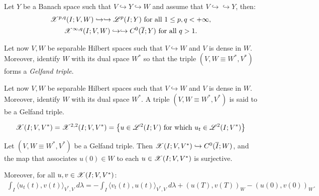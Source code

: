 \begin{theorem}
    Let $Y$ be a Banach space such that $V \hookrightarrow Y \hookrightarrow W$ and assume that $V \hookrightarrow \hookrightarrow Y$, then:
    \begin{gather}
        \mathscr{X}^{p, q}(I; V, W) \hookrightarrow \hookrightarrow \mathscr{L}^{p}(I; Y) \text{ for all } 1 \leq p, q < +\infty,\\
        \mathscr{X}^{\infty, q}(I; V, W) \hookrightarrow \hookrightarrow C^0(\overline{I}; Y) \text{ for all } q > 1.
    \end{gather}
\end{theorem}

Let now $V, W$ be separable Hilbert spaces such that $V \hookrightarrow W$ and $V$ is dense in $W$. Moreover, identify $W$ with its dual space $W^*$ so that the triple $(V, W \equiv W^*, V^*)$ forms a \textit{Gelfand triple}.

\begin{definition} \label{definition:gelfand}
    Let now $V, W$ be separable Hilbert spaces such that $V \hookrightarrow W$ and $V$ is dense in $W$. Moreover, identify $W$ with its dual space $W^*$. A triple $\left( V, W \equiv W^*, V^* \right)$ is said to be a Gelfand triple.
\end{definition}

\begin{definition}[$\X(I; V, V^*)$] \label{definition:x}
    \begin{gather}
        \mathscr{X}(I; V, V^*) = \mathscr{X}^{2, 2}(I; V, V^*) = \left\{ u \in \mathscr{L}^{2}(I; V) \text{ for which } u_t \in \mathscr{L}^{2}(I; V^*) \right\}
    \end{gather}
\end{definition}

\begin{theorem}
    Let $\left( V, W \equiv W^*, V^* \right)$ be a Gelfand triple. Then $\mathscr{X}(I; V, V^*) \hookrightarrow C^0(\overline{I};W)$, and the map that associates $u(0) \in W$ to each $u \in \mathscr{X}(I; V, V^*)$ is surjective.

    Moreover, for all $u, v \in \mathscr{X}(I; V, V^*)$:
    \begin{gather}
        \int_I \langle u_t(t), v(t) \rangle_{V^*, V} ~ d \lambda = - \int_I \langle v_t(t), u(t) \rangle_{V^*, V} ~ d \lambda + \left( u(T), v(T) \right)_W - \left( u(0), v(0) \right)_W.
    \end{gather}
\end{theorem}

